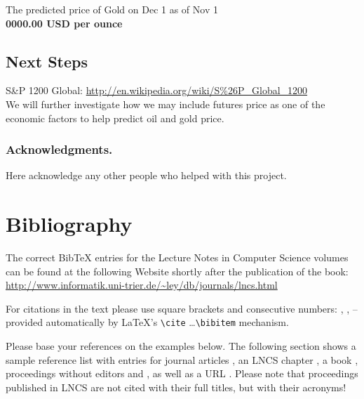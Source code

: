 \documentclass[runningheads]{llncs}
\begin{document}
\noindent The predicted price of Gold on Dec 1 as of Nov 1 \\
\textbf{0000.00 USD per ounce} \\

\subsection {Next Steps}

S\&P 1200 Global: \url {http://en.wikipedia.org/wiki/S%26P_Global_1200} \\

\noindent We will further investigate how we may include futures price as one of the economic factors to help predict oil and gold price. \\


\subsubsection*{Acknowledgments.} Here acknowledge any other people who helped with this project.

\section{Bibliography}\label{references}

The correct BibTeX entries for the Lecture Notes in Computer Science
volumes can be found at the following Website shortly after the
publication of the book:
\url{http://www.informatik.uni-trier.de/~ley/db/journals/lncs.html}

For citations in the text please use
square brackets and consecutive numbers: \cite{jour}, \cite{lncschap},
\cite{proceeding1} -- provided automatically
by \LaTeX 's \verb|\cite| \dots\verb|\bibitem| mechanism.

Please base your references on the
examples below. 
The following section shows a sample reference list with entries for
journal articles \cite{jour}, an LNCS chapter \cite{lncschap}, a book
\cite{book}, proceedings without editors \cite{proceeding1} and
\cite{proceeding2}, as well as a URL \cite{url}.
Please note that proceedings published in LNCS are not cited with their
full titles, but with their acronyms!
\end{document}
